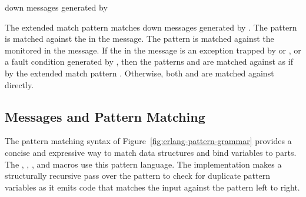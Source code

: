 \begin{match-extension}
\end{match-extension}
\matches{} down messages generated by 

The extended match pattern 
matches down messages generated by .
The pattern  is matched against the  in the message.
The pattern  is matched against the monitored  in the message.
If the  in the message is
an exception trapped by  or , or
a fault condition generated by ,
then the patterns  and  are matched against
 as if by the extended match pattern
.
Otherwise, both  and  are matched against  directly.

\subsection {Messages and Pattern Matching}

The pattern matching syntax of Figure~\ref{fig:erlang-pattern-grammar}
provides a concise and expressive way to match data structures and
bind variables to parts. The , ,
, and
 macros use this pattern language. The
implementation makes a structurally recursive pass over the
pattern to check for duplicate pattern variables as it emits
code that matches the input against the pattern left to right.

